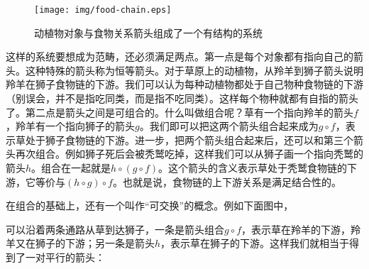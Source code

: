 \documentclass{article}
\begin{document}
\begin{figure}[htbp]
 \centering
 \texttt{[image: img/food-chain.eps]}
 \caption{动植物对象与食物关系箭头组成了一个有结构的系统}
 \label{fig:powerset}
\end{figure}

这样的系统要想成为范畴，还必须满足两点。第一点是每个对象都有指向自己的箭头。这种特殊的箭头称为恒等箭头。对于草原上的动植物，从羚羊到狮子箭头说明羚羊在狮子食物链的下游。我们可以认为每种动植物都处于自己物种食物链的下游（别误会，并不是指吃同类，而是指不吃同类）。这样每个物种就都有自指的箭头了。第二点是箭头之间是可组合的。什么叫做组合呢？草有一个指向羚羊的箭头$f$，羚羊有一个指向狮子的箭头$g$。我们即可以把这两个箭头组合起来成为$g \circ f$，表示草处于狮子食物链的下游。进一步，把两个箭头组合起来后，还可以和第三个箭头再次组合。例如狮子死后会被秃鹫吃掉，这样我们可以从狮子画一个指向秃鹫的箭头$h$。组合在一起就是$h \circ (g \circ f)$。这个箭头的含义表示草处于秃鹫食物链的下游，它等价与$(h \circ g) \circ f$。也就是说，食物链的上下游关系是满足结合性的。

在组合的基础上，还有一个叫作“可交换”的概念。例如下面图中，

\begin{center}
\end{center}

可以沿着两条通路从草到达狮子，一条是箭头组合$g \circ f$，表示草在羚羊的下游，羚羊又在狮子的下游；另一条是箭头$h$，表示草在狮子的下游。这样我们就相当于得到了一对平行的箭头：

\begin{center}
\end{center}
\end{document}
